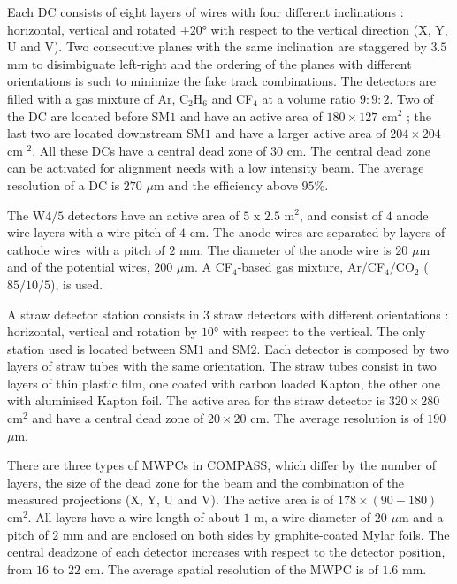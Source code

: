 Each DC consists of eight layers of wires with four different inclinations : horizontal, vertical and rotated $\pm$$20$° with respect to the vertical direction (X, Y, U and V). Two consecutive planes with the same inclination are staggered by $3.5$ mm to disimbiguate left-right and the ordering of the planes with different orientations is such to minimize the fake track combinations. The detectors are filled with a gas mixture of Ar, C$_2$H$_6$ and CF$_4$ at a volume ratio $9:9:2$. Two of the DC are located before SM$1$ and have an active area of $180 \times 127$ cm$^2$ ; the last two are located downstream SM$1$ and have a larger active area of $204 \times 204$ cm $^2$. All these DCs have a central dead zone of $30$ cm. The central dead zone can be activated for alignment needs with a low intensity beam. The average resolution of a DC is $270$ $\mu$m and the efficiency above $95$\%.

The W$4/5$ detectors have an active area of $5$ x $2.5$ m$^2$, and consist of $4$ anode wire layers with a wire pitch of $4$ cm. The anode wires are separated by layers of cathode wires with a pitch of $2$ mm. The diameter of the anode wire is $20$ $\mu$m and of the potential wires, $200$ $\mu$m. A CF$_4$-based gas mixture, Ar/CF$_4$/CO$_2$ ($85/10/5$), is used.

A straw detector station consists in $3$ straw detectors with different orientations : horizontal, vertical and rotation by $10$° with respect to the vertical. The only station used is located between SM$1$ and SM$2$. Each detector is composed by two layers of straw tubes with the same orientation. The straw tubes consist in two layers of thin plastic film, one coated with carbon loaded Kapton, the other one with aluminised Kapton foil. The active area for the straw detector is $320 \times 280$ cm$^2$ and have a central dead zone of $20 \times 20$ cm. The average resolution is of $190$ $\mu$m.

There are three types of MWPCs in COMPASS, which differ by the number of layers, the size of the dead zone for the beam and the combination of the measured projections (X, Y, U and V). The active area is of $178 \times (90-180)$ cm$^2$. All layers have a wire length of about $1$ m, a wire diameter of $20$ $\mu$m and a pitch of $2$ mm and are enclosed on both sides by graphite-coated Mylar foils. The central deadzone of each detector increases with respect to the detector position, from $16$ to $22$ cm. The average spatial resolution of the MWPC is of $1.6$ mm.

